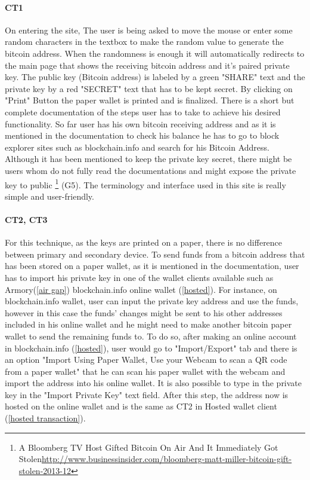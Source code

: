 \paragraph{CT1} On entering the site, The user is being asked to move the mouse or enter some random characters in the textbox to make the random value to generate the bitcoin address. When the randomness is enough it will automatically redirects to the main page that shows the receiving bitcoin address and it's paired private key. The public key (Bitcoin address) is labeled by a green "SHARE" text and the private key by a red "SECRET" text that has to be kept secret. By clicking on "Print" Button the paper wallet is printed and is finalized. There is a short but complete documentation of the steps user has to take to achieve his desired functionality. So far user has his own bitcoin receiving address and as it is mentioned in the documentation to check his balance he has to go to block explorer sites such as blockchain.info and search for his Bitcoin Address. Although it has been mentioned to keep the private key secret, there might be users whom do not fully read the documentations and might expose the private key to public \footnote{A Bloomberg TV Host Gifted Bitcoin On Air And It Immediately Got Stolen\url{http://www.businessinsider.com/bloomberg-matt-miller-bitcoin-gift-stolen-2013-12}} (G5). The terminology and interface used in this site is really simple and user-friendly.

\paragraph{CT2, CT3} For this technique, as the keys are printed on a paper, there is no difference between primary and secondary device.
To send funds from a bitcoin address that has been stored on a paper wallet, as it is mentioned in the documentation, user has to import his private key in one of the wallet clients available such as Armory(\ref{air gap}) blockchain.info online wallet (\ref{hosted}). For instance, on blockchain.info wallet, user can input the private key address and use the funds, however in this case the funds' changes might be sent to his other addresses included in his online wallet and he might need to make another bitcoin paper wallet to send the remaining funds to. To do so, after making an online account in blockchain.info (\ref{hosted}), user would go to "Import/Export" tab and there is an option "Import Using Paper Wallet, Use your Webcam to scan a QR code from a paper wallet" that he can scan his paper wallet with the webcam and import the address into his online wallet. It is also possible to type in the private key in the "Import Private Key" text field. After this step, the address now is hosted on the online wallet and is the same as CT2 in Hosted wallet client (\ref{hosted transaction}).

